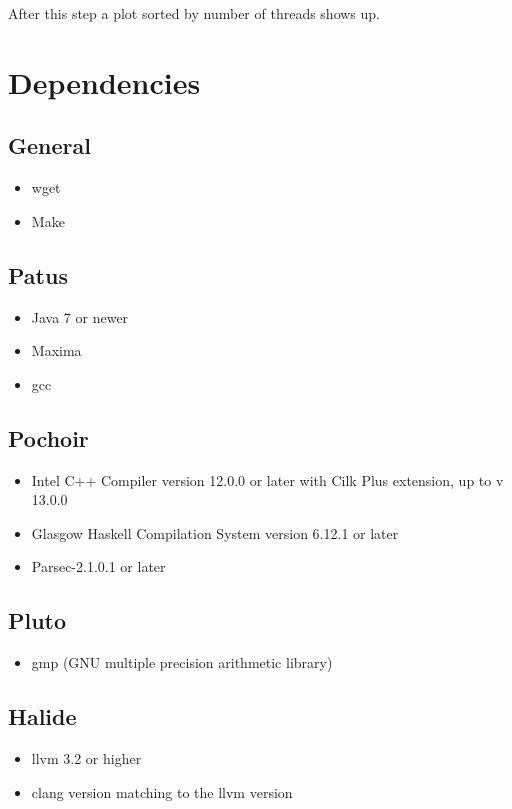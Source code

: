 \documentclass[AEJ]{AEA}
\begin{document}
After this step a plot sorted by number of threads shows up.
\newpage
\section{Dependencies}
\subsection{General}
\begin{itemize}
	\item wget
	\item Make
\end{itemize}

\subsection{Patus}
\begin{itemize}
	\item Java 7 or newer
	\item Maxima
	\item gcc
\end{itemize}
\subsection{Pochoir}

\begin{itemize}
	\item Intel C++ Compiler version 12.0.0 or later with Cilk Plus extension, up to v 13.0.0
	\item Glasgow Haskell Compilation System version 6.12.1 or later
	\item Parsec-2.1.0.1 or later
\end{itemize}
\subsection{Pluto}

\begin{itemize}
	\item gmp (GNU multiple precision arithmetic library)
\end{itemize}

\subsection{Halide}

\begin{itemize}
	\item llvm 3.2 or higher
	\item clang version matching to the llvm version
\end{itemize}
\end{document}
